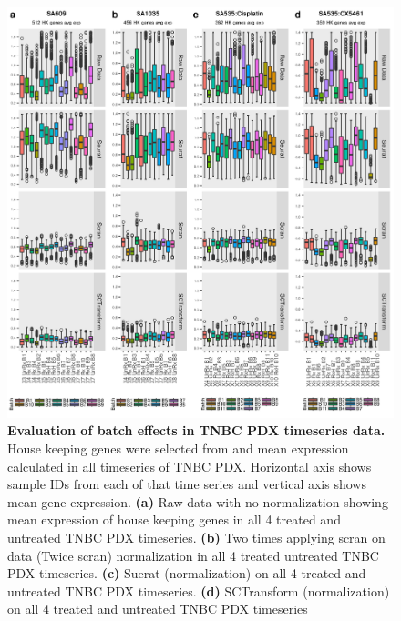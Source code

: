 
\begin{figure}
\centering
\includegraphics[width=\textwidth]{Figures/chap5/Comparisonofbatcheffects.png}
	
\caption[Summary of overall read count of the data presented.]
	{\small
	\textbf{Evaluation of batch effects in TNBC PDX timeseries data.}
	  House keeping genes were selected from \cite{lin2019evaluating} and mean expression calculated in all timeseries of TNBC PDX. Horizontal axis shows sample IDs from each of that time series and vertical axis shows mean gene expression.
	   \textbf{(a)} Raw data with no normalization showing mean expression of house keeping genes in all 4 treated and untreated TNBC PDX timeseries. 
	    \textbf{(b)} Two times applying scran on data (Twice scran) normalization  in all 4 treated untreated TNBC PDX timeseries.
	    \textbf{(c)} Suerat (normalization) on  all 4 treated and untreated TNBC PDX timeseries.
	    \textbf{(d)} SCTransform (normalization) on  all 4 treated and  untreated TNBC PDX timeseries
	}
	\label{fig:Comparisonofbatcheffects}
\end{figure}

